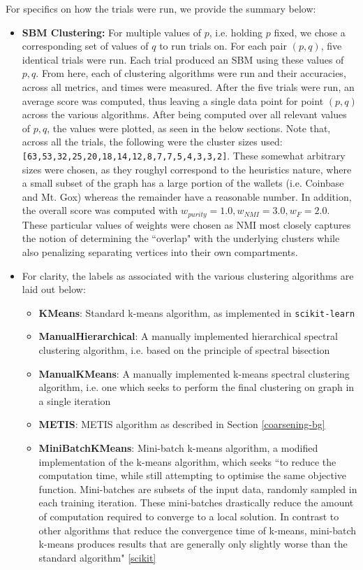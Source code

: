 \documentclass{article}
\begin{document}
For specifics on how the trials were run, we provide the summary below:
\begin{itemize}
    \item \textbf{SBM Clustering:} For multiple values of $p$, i.e. holding $p$ fixed, we chose a corresponding set of values of $q$ to run trials on. For each pair $(p,q)$, five identical trials were run. Each trial produced an SBM using these values of $p,q$. From here, each of clustering algorithms were run and their accuracies, across all metrics, and times were measured. After the five trials were run, an average score was computed, thus leaving a single data point for point $(p,q)$ across the various algorithms. After being computed over all relevant values of $p,q$, the values were plotted, as seen in the below sections. Note that, across all the trials, the following were the cluster sizes used: \texttt{[63,53,32,25,20,18,14,12,8,7,7,5,4,3,3,2]}. These somewhat arbitrary sizes were chosen, as they roughyl correspond to the heuristics nature, where a small subset of the graph has a large portion of the wallets (i.e. Coinbase and Mt. Gox) whereas the remainder have a reasonable number. In addition, the overall score was computed with $w_{purity}=1.0,w_{NMI}=3.0,w_{F}=2.0$. These particular values of weights were chosen as NMI most closely captures the notion of determining the ``overlap" with the underlying clusters while also penalizing separating vertices into their own compartments. 
    \item For clarity, the labels as associated with the various clustering algorithms are laid out below:
    \begin{itemize}
        \item \textbf{KMeans}: Standard k-means algorithm, as implemented in \texttt{scikit-learn}
        \item \textbf{ManualHierarchical}: A manually implemented hierarchical spectral clustering algorithm, i.e. based on the principle of spectral bisection
        \item \textbf{ManualKMeans}: A manually implemented k-means spectral clustering algorithm, i.e. one which seeks to perform the final clustering on graph in a single iteration
        \item \textbf{METIS}: METIS algorithm as described in Section \ref{coarsening-bg}
        \item \textbf{MiniBatchKMeans}: Mini-batch k-means algorithm, a modified implementation of the k-means algorithm, which seeks ``to reduce the computation time, while still attempting to optimise the same objective function. Mini-batches are subsets of the input data, randomly sampled in each training iteration. These mini-batches drastically reduce the amount of computation required to converge to a local solution. In contrast to other algorithms that reduce the convergence time of k-means, mini-batch k-means produces results that are generally only slightly worse than the standard algorithm" \ref{scikit}

\end{itemize}
\end{itemize}
\end{document}
